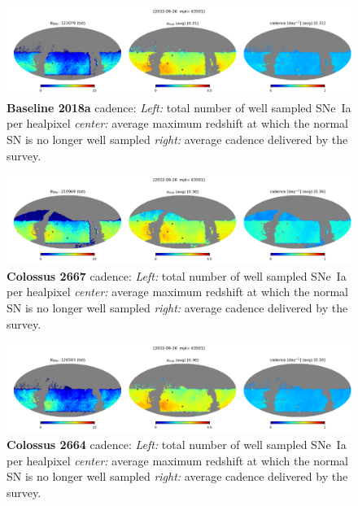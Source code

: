 \begin{figure}[h!]
  \begin{center}
    \includegraphics[width=\linewidth]{Figures/baseline2018a_64_maps.png}
    \caption{{\bf Baseline 2018a} cadence: {\em Left:} total number of well
      sampled SNe~Ia per healpixel {\em center:} average maximum
      redshift at which the normal SN is no longer well sampled {\em
        right:} average cadence delivered by the survey.}
  \end{center}
\end{figure}

\begin{figure}[h!]
  \begin{center}
    \includegraphics[width=\linewidth]{Figures/colossus_2667_64_maps.png}
    \caption{{\bf Colossus 2667} cadence: {\em Left:} total number of well
      sampled SNe~Ia per healpixel {\em center:} average maximum
      redshift at which the normal SN is no longer well sampled {\em
        right:} average cadence delivered by the survey.}
  \end{center}
\end{figure}

\begin{figure}[h!]
  \begin{center}
    \includegraphics[width=\linewidth]{Figures/colossus_2664_64_maps.png}
    \caption{{\bf Colossus 2664} cadence: {\em Left:} total number of well
      sampled SNe~Ia per healpixel {\em center:} average maximum
      redshift at which the normal SN is no longer well sampled {\em
        right:} average cadence delivered by the survey.}
  \end{center}
\end{figure}


